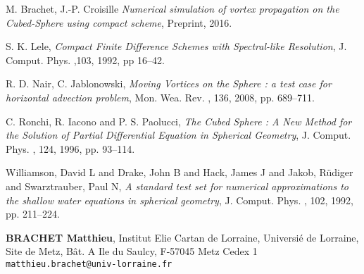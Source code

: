 \documentclass[10pt]{article}
\def\auteurenbasdepage#1#2#3{\small{\bf #1}, \small{#2}\\ \small{\tt #3}\\ }
\begin{document}

\begin{thebibliography}{99}

 {\sc M. Brachet, J.-P. Croisille} {\sl Numerical simulation of vortex propagation on the Cubed-Sphere using compact scheme}, Preprint, 2016.

 {\sc S. K. Lele}, {\sl Compact Finite Difference Schemes with Spectral-like Resolution}, J. Comput. Phys. ,103, 1992, pp 16--42.

 {\sc R. D. Nair, C. Jablonowski}, {\sl Moving Vortices on the Sphere : a test case for horizontal advection problem}, Mon. Wea. Rev. , 136, 2008, pp. 689--711.

 {\sc C. Ronchi, R. Iacono and P. S. Paolucci}, {\sl The Cubed Sphere : A New Method for the Solution of Partial Differential Equation in Spherical Geometry}, J. Comput. Phys. , 124, 1996, pp. 93--114.

 {\sc Williamson, David L and Drake, John B and Hack, James J and Jakob, R{\"u}diger and Swarztrauber, Paul N}, {\sl A standard test set for numerical approximations to the shallow water equations in spherical geometry}, J. Comput. Phys. , 102, 1992, pp. 211--224.


\end{thebibliography}
%
\vfill
\auteurenbasdepage{BRACHET Matthieu}{Institut Elie Cartan de Lorraine, Universi\'e de Lorraine,
Site de Metz, B\^at.  A Ile du Saulcy, F-57045 Metz Cedex 1}{matthieu.brachet@univ-lorraine.fr}
%
\end{document}
